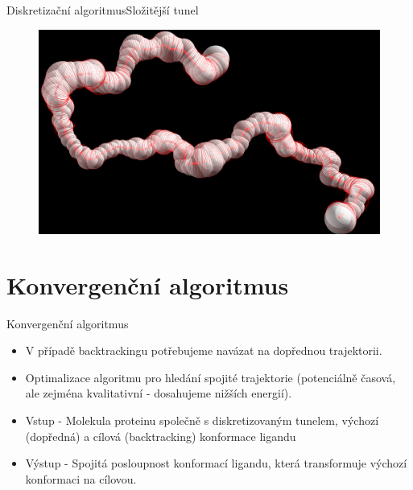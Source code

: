 \documentclass{beamer}
\begin{document}
\begin{frame}{Diskretizační algoritmus}{Složitější tunel}
    \begin{figure}
        \includegraphics[width=\textwidth]{img/1YGE.png}
    \end{figure}
\end{frame}


\section{Konvergenční algoritmus}
\begin{frame}{Konvergenční algoritmus}
    \begin{itemize}
	\item V případě backtrackingu potřebujeme navázat na dopřednou trajektorii.
	\item Optimalizace algoritmu pro hledání spojité trajektorie (potenciálně časová, ale zejména kvalitativní - dosahujeme nižších energií).
	\item Vstup - Molekula proteinu společně s diskretizovaným tunelem, výchozí (dopředná) a cílová (backtracking) konformace ligandu
	\item Výstup - Spojitá posloupnost konformací ligandu, která transformuje výchozí konformaci na cílovou.
	\end{itemize}
\end{frame}
\end{document}
